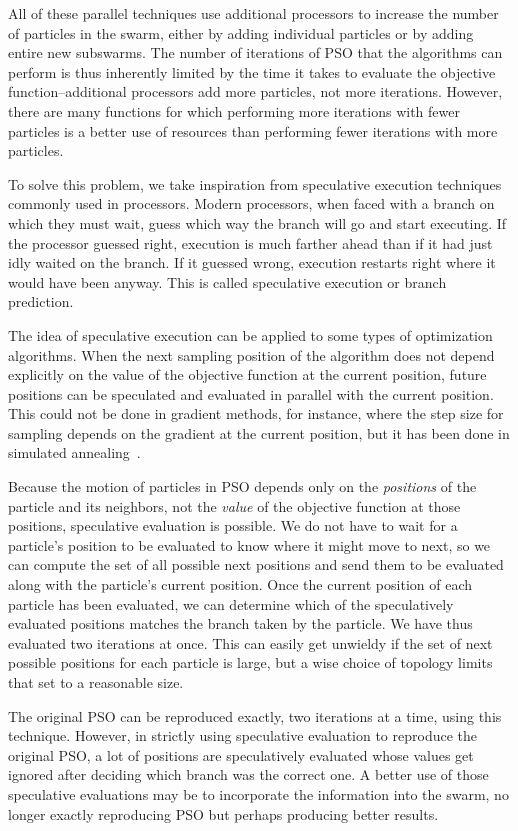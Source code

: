 \documentclass[conference,letterpaper]{IEEEtran}
\begin{document}
All of these parallel techniques use additional processors to increase the
number of particles in the swarm, either by adding individual particles or by
adding entire new subswarms.  The number of iterations of PSO that the
algorithms can perform is thus inherently limited by the time it takes to
evaluate the objective function--additional processors add more particles, not
more iterations.  However, there are many functions for which performing more
iterations with fewer particles is a better use of resources than performing
fewer iterations with more particles.  

To solve this problem, we take inspiration from speculative execution
techniques commonly used in processors.  Modern processors, when faced with a
branch on which they must wait, guess which way the branch will go and start
executing.  If the processor guessed right, execution is much farther ahead
than if it had just idly waited on the branch.  If it guessed wrong, execution
restarts right where it would have been anyway.  This is called speculative
execution or branch prediction.

The idea of speculative execution can be applied to some types of optimization
algorithms.  When the next sampling position of the algorithm does not depend
explicitly on the value of the objective function at the current position,
future positions can be speculated and evaluated in parallel with the current
position.  This could not be done in gradient methods, for instance, where the
step size for sampling depends on the gradient at the current position, but it
has been done in simulated annealing~\cite{witte-tpds91}.

Because the motion of particles in PSO depends only on the \emph{positions} of
the particle and its neighbors, not the \emph{value} of the objective function
at those positions, speculative evaluation is possible.  We do not have to wait
for a particle's position to be evaluated to know where it might move to next,
so we can compute the set of all possible next positions and send them to be
evaluated along with the particle's current position.  Once the current
position of each particle has been evaluated, we can determine which of the
speculatively evaluated positions matches the branch taken by the particle.  We
have thus evaluated two iterations at once.  This can easily get unwieldy if
the set of next possible positions for each particle is large, but a wise
choice of topology limits that set to a reasonable size.

The original PSO can be reproduced exactly, two iterations at a time, using
this technique.  However, in strictly using speculative evaluation to reproduce
the original PSO, a lot of positions are speculatively evaluated whose values
get ignored after deciding which branch was the correct one.  A better use of
those speculative evaluations may be to incorporate the information into the
swarm, no longer exactly reproducing PSO but perhaps producing better results.
\end{document}

